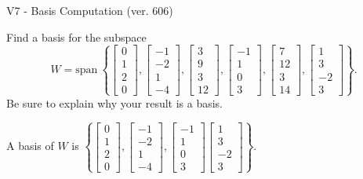 \begin{exercise}
  \begin{exerciseTitle}V7 - Basis Computation (ver. 606)\end{exerciseTitle}
  \begin{exerciseStatement}
    Find a basis for the subspace 
\[W=\mathrm{span}\ \left\{\left[\begin{array}{r}
0 \\
1 \\
2 \\
0
\end{array}\right] , \left[\begin{array}{r}
-1 \\
-2 \\
1 \\
-4
\end{array}\right] , \left[\begin{array}{r}
3 \\
9 \\
3 \\
12
\end{array}\right] , \left[\begin{array}{r}
-1 \\
1 \\
0 \\
3
\end{array}\right] , \left[\begin{array}{r}
7 \\
12 \\
3 \\
14
\end{array}\right] , \left[\begin{array}{r}
1 \\
3 \\
-2 \\
3
\end{array}\right]\right\}.\]
 Be sure to explain why your result is a basis.


  \end{exerciseStatement}
  \begin{exerciseAnswer}
   A basis of \(W\) is  \(\left\{\left[\begin{array}{r}
0 \\
1 \\
2 \\
0
\end{array}\right] , \left[\begin{array}{r}
-1 \\
-2 \\
1 \\
-4
\end{array}\right] , \left[\begin{array}{r}
-1 \\
1 \\
0 \\
3
\end{array}\right] \left[\begin{array}{r}
1 \\
3 \\
-2 \\
3
\end{array}\right]\right\}\).
  


  \end{exerciseAnswer}
\end{exercise}